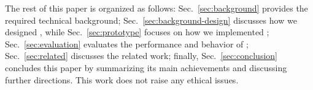 
The rest of this paper is organized as follows: Sec.~\ref{sec:background}
provides the required technical background; Sec.~\ref{sec:background-design}
discusses how we designed \tcpls, while Sec.~\ref{sec:prototype} focuses on how
we implemented \tcpls; Sec.~\ref{sec:evaluation} evaluates the performance and
behavior of \tcpls; Sec.~\ref{sec:related} discusses the related work;  finally, Sec.~\ref{sec:conclusion} concludes this paper by
summarizing its main achievements and discussing further directions.  This work
does not raise any ethical issues.
